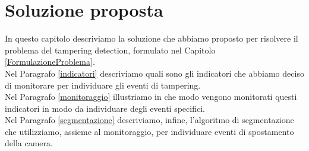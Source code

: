 \chapter{Soluzione proposta}
\label{SoluzioneProposta}
\thispagestyle{empty}


\noindent In questo capitolo descriviamo la soluzione che abbiamo proposto per risolvere il problema del tampering detection, formulato nel Capitolo \ref{FormulazioneProblema}.\\
Nel Paragrafo \ref{indicatori} descriviamo quali sono gli indicatori che abbiamo deciso di monitorare per individuare gli eventi di tampering.\\
Nel Paragrafo  \ref{monitoraggio} illustriamo in che modo vengono monitorati questi indicatori in modo da individuare degli eventi specifici.\\
Nel Paragrafo \ref{segmentazione} descriviamo, infine, l'algoritmo di segmentazione che utilizziamo, assieme al monitoraggio, per individuare eventi di spostamento della camera.
